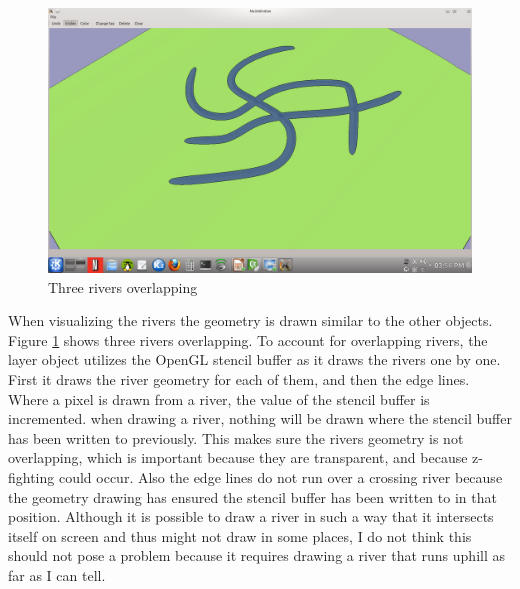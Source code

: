 \documentclass[a4paper,12pt]{report}
\begin{document}
\begin{figure}
\centering
\includegraphics[trim = 30mm 30mm 10mm 20mm, clip,width=.7\linewidth]{thesis/riverOverlap.png}
 \caption{Three rivers overlapping}
 \label{fig:riverOverlap}
\end{figure}
When visualizing the rivers the geometry is drawn similar to the other objects. Figure \ref{fig:riverOverlap} shows three rivers overlapping. To account for overlapping rivers, the layer object utilizes the OpenGL stencil buffer as it draws the rivers one by one. First it draws the river geometry for each of them, and then the edge lines. Where a pixel is drawn from a river, the value of the stencil buffer is incremented. when drawing a river, nothing will be drawn where the stencil buffer has been written to previously. This makes sure the rivers geometry is not overlapping, which is important because they are transparent, and because z-fighting could occur. Also the edge lines do not run over a crossing river because the geometry drawing has ensured the stencil buffer has been written to in that position. Although it is possible to draw a river in such a way that it intersects itself on screen and thus might not draw in some places, I do not think this should not pose a problem because it requires drawing 
a river that runs uphill as far as I can tell.
\end{document}
